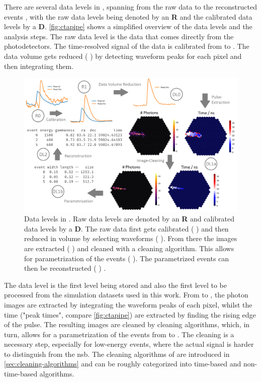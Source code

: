 There are several data levels in \ctapipe{}, spanning from the raw data \rzero{} to the reconstructed events
\dlt{}, with the raw data levels being denoted by an \textbf{R} and the calibrated data levels by a \textbf{D}.
\autoref{fig:ctapipe} shows a simplified overview of the data levels and the analysis steps.
The raw data level \rzero{} is the data that comes directly from the photodetectors. The time-resolved
signal of the data is calibrated from \rzero{} to \rone{}. The data volume gets reduced
(\rone{} \rightarrow \dlz{}) by detecting waveform peaks for each pixel and then integrating them.
\begin{figure}
    \centering
    \includegraphics[width=\textwidth]{graphics/ctapipe.png}
    \caption{Data levels in \ctapipe{}. Raw data levels are denoted by an \textbf{R} and calibrated
    data levels by a \textbf{D}. The raw data first gets calibrated (\rzero{} \rightarrow \rone{})
    and then reduced in volume by selecting waveforms (\rone{} \rightarrow \dlz{}). From there the
    images are extracted (\dlz{} \rightarrow \dloa{}) and cleaned with a cleaning algorithm. This
    allows for parametrization of the events (\dloa{} \rightarrow \dlob{}). The parametrized events
    can then be reconstructed (\dlob{} \rightarrow \dlt{}) \cite{noethe_thesis, hackfeld}.}
    \label{fig:ctapipe}
\end{figure}

The \dlz{} data level is the first level being stored and also the first level to be processed from
the simulation datasets used in this work. From \dlz{} to \dloa{}, the photon images are extracted
by integrating the waveform peaks of each pixel, whilst the time ("peak times", compare \autoref{fig:ctapipe})
are extracted by finding the rising edge of the pulse. The resulting images are cleaned by cleaning algorithms,
which, in turn, allows for a parametrization of the events from \dloa{} to \dlob{}.
The cleaning is a necessary step, especially for
low-energy events, where the actual signal is harder to distinguish from the \gls{nsb}. The cleaning algorithms
of \ctapipe{} are introduced in \autoref{sec:cleaning-algorithms} and can be roughly categorized into
time-based and non-time-based algorithms.

